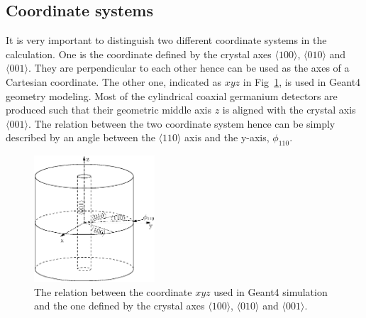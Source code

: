 \subsection{Coordinate systems}
\label{sec:pss:xyz}
It is very important to distinguish two different coordinate systems in the calculation. One is the coordinate defined by the crystal axes $\langle100\rangle$, $\langle010\rangle$ and $\langle001\rangle$. They are perpendicular to each other hence can be used as the axes of a Cartesian coordinate. The other one, indicated as $xyz$ in Fig~\ref{fig:pss:coo}, is used in Geant4 geometry modeling. Most of the cylindrical coaxial germanium detectors are produced such that their geometric middle axis $z$ is aligned with the crystal axis $\langle 001 \rangle$. The relation between the two coordinate system hence can be simply described by an angle between the $\langle110\rangle$ axis and the y-axis, $\phi_{110}$.
\begin{figure}
\centering
\includegraphics[width=0.4\textwidth]{coordins}  
\caption{The relation between the coordinate $xyz$ used in Geant4 simulation and the one defined by the crystal axes $\langle 100 \rangle$, $\langle 010 \rangle$ and $\langle 001 \rangle$.}
\label{fig:pss:coo}
\end{figure}

